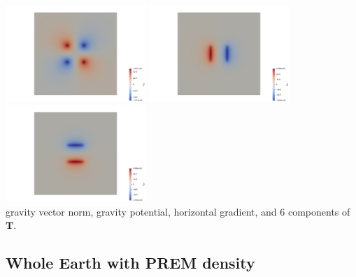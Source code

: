 \begin{center}
\includegraphics[width=5.3cm]{python_codes/fieldstone_84/arct15/Txy}
\includegraphics[width=5.3cm]{python_codes/fieldstone_84/arct15/Txz}
\includegraphics[width=5.3cm]{python_codes/fieldstone_84/arct15/Tyz}\\
{\captionfont gravity vector norm, gravity potential, horizontal gradient,
and 6 components of ${\bm T}$.}
\end{center}


\subsection*{Whole Earth with PREM density}


